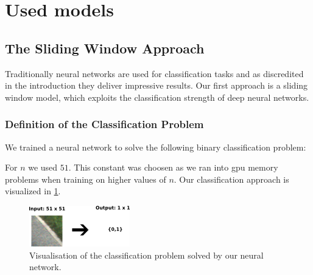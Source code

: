 
\section{Used models}\label{sec:model}

\subsection{The Sliding Window Approach}

Traditionally neural networks are used for classification tasks and as discredited in the introduction they deliver impressive results. Our first approach is a sliding window model, which exploits the classification strength of deep neural networks.

\subsubsection{Definition of the Classification Problem}

We trained a neural network to solve the following binary classification problem:


For $n$ we used $51$. This constant was choosen as we ran into gpu memory problems when training on higher values of $n$. Our classification approach is visualized in \cref{fig:figure}.

\begin{figure}[H]
	\centering
	\includegraphics[width=0.5\columnwidth]{figures/models/sliding_window.png}
	\caption{Visualisation of the classification problem solved by our neural network.}
	\label{fig:figure}
\end{figure}


